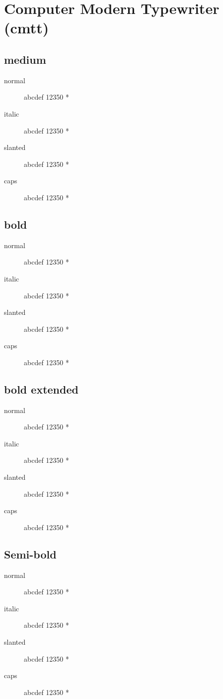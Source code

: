 \section{Computer Modern Typewriter (cmtt)}

\subsection{medium}
\begin{description}
    \item [normal]  abcdef 12350 *
    \item [italic]  abcdef 12350 *
    \item [slanted]  abcdef 12350 *
    \item [caps]  abcdef 12350 *
\end{description}
    
\subsection{bold}
\begin{description}
    \item [normal]  abcdef 12350 *
    \item [italic]  abcdef 12350 *
    \item [slanted]  abcdef 12350 *
    \item [caps]  abcdef 12350 *
\end{description}
    
\subsection{bold extended}
\begin{description}
    \item [normal]  abcdef 12350 *
    \item [italic]  abcdef 12350 *
    \item [slanted]  abcdef 12350 *
    \item [caps]  abcdef 12350 *
\end{description}

\subsection{Semi-bold}
\begin{description}
    \item [normal]  abcdef 12350 *
    \item [italic]  abcdef 12350 *
    \item [slanted]  abcdef 12350 *
    \item [caps]  abcdef 12350 *
\end{description}

